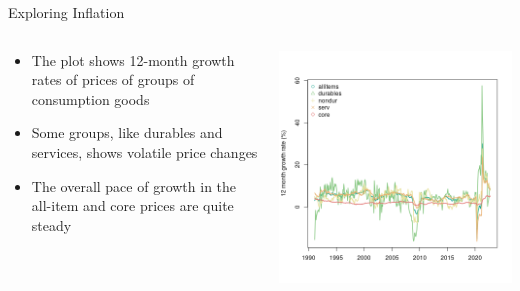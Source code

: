     \begin{frame}{Exploring Inflation}
        \begin{columns}
        \begin{column}{0.5\textwidth}
        \begin{itemize}
            \item<1-> The plot shows 12-month growth rates of prices of groups of consumption goods
            \item<2-> Some groups, like durables and services, shows volatile price changes
            \item<3-> The overall pace of growth in the all-item and core prices are quite steady
        \end{itemize}
        \end{column}
        \begin{column}{0.5\textwidth}  %
            \begin{center}
             \includegraphics[width=\textwidth]{../../figures/growth12.png}
             \end{center}
        \end{column}
        \end{columns}
    \end{frame}



